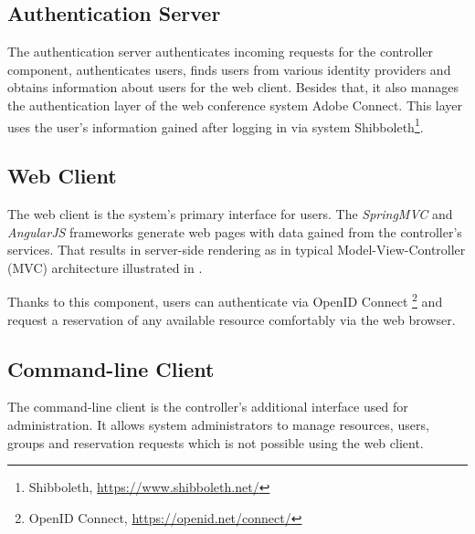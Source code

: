 \subsection{Authentication Server}
The authentication server authenticates incoming requests for the controller component, authenticates users, finds users from various identity providers and obtains information about users for the web client.
Besides that, it also manages the authentication layer of the web conference system Adobe Connect. This layer uses the user's information gained after logging in via system Shibboleth\footnote{Shibboleth, \url{https://www.shibboleth.net/}}.

\subsection{Web Client} \label{webclient}
The web client is the system's primary interface for users. The \emph{SpringMVC} and \emph{AngularJS} frameworks generate web pages with data gained from the controller’s services. That results in server-side rendering as in typical Model-View-Controller (MVC) architecture illustrated in .


Thanks to this component, users can authenticate via OpenID Connect \footnote{OpenID Connect, \url{https://openid.net/connect/}} and request a reservation of any available resource comfortably via the web browser.

\subsection{Command-line Client}
The command-line client is the controller's additional interface used for administration. It allows system administrators to manage resources, users, groups and reservation requests which is not possible using the web client.

